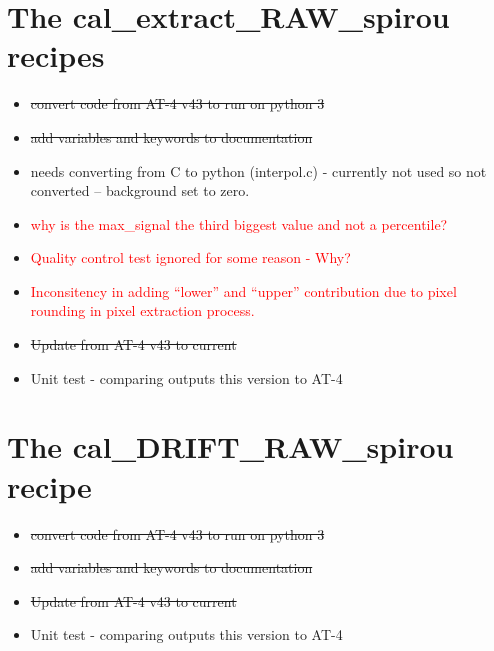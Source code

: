 \section{The cal\_extract\_RAW\_spirou recipes}
\label{ch:todo:cal_extract_RAW_spirou}

\begin{itemize}
	\item \sout{convert code from AT-4 v43 to run on python 3}
	\item \sout{add variables and keywords to documentation}
	\item {} needs converting from C to python (interpol.c) - currently not used so not converted -- background set to zero.
	\item \textcolor{red}{ why is the max\_signal the third biggest value and not a percentile?}
	\item \textcolor{red}{Quality control test  ignored for some reason - Why?}
	\item \textcolor{red}{Inconsitency in adding ``lower'' and ``upper'' contribution due to pixel rounding in pixel extraction process.}
	\item \sout{Update from AT-4 v43 to current}
	\item Unit test - comparing outputs this version to AT-4
\end{itemize}

\section{The cal\_DRIFT\_RAW\_spirou recipe}
\label{ch:todo:cal_DRIFT_RAW_spirou}

\begin{itemize}
	\item \sout{convert code from AT-4 v43 to run on python 3}
	\item \sout{add variables and keywords to documentation}
	\item \sout{Update from AT-4 v43 to current}
	\item Unit test - comparing outputs this version to AT-4
\end{itemize}


